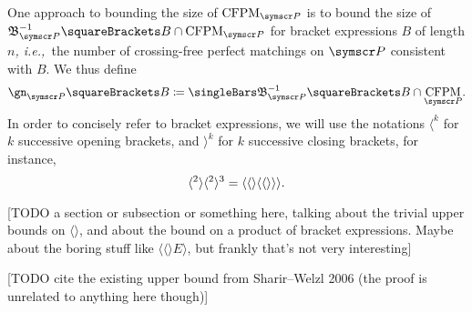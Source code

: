 \documentclass[10pt, a4paper, twoside]{basestyle}
\newcommand{\idest}{\emph{, i.e.,\ }}
\DeclareMathOperator{\CFPM}{CFPM}
\newcommand{\pointset}{\symscr}
\begin{document}
One approach to bounding the size of $\CFPM_{\pointset P}$ is to bound the size of
${\mathfrak B}_{\pointset P}^{-1}\of{B}\Intersection \CFPM_{\pointset P}$ for bracket expressions $B$ of length $n$\idest the
number of crossing-free perfect matchings on $\pointset P$ consistent with $B$. We thus define
\[\gn_{\pointset P}\of B \DefineAs
\Cardinality{{\mathfrak B}_{\pointset P}^{-1}\of{B}\Intersection \CFPM_{\pointset P}}\text.\]
In order to concisely refer to bracket expressions, we will use the notations
$\langle^k$ for $k$ successive opening brackets, and $\rangle^k$ for $k$ successive
closing brackets, for instance,\[
\langle^2\rangle\langle^2\rangle^3 = \langle\langle\rangle\langle\langle\rangle\rangle\rangle
\text.\]

[TODO a section or subsection or something here, talking about the trivial upper bounds on $\langle\rangle$,
and about the bound on a product of bracket expressions. Maybe about the boring stuff like
$\langle\langle\rangle E \rangle$, but frankly that's not very interesting]

[TODO cite the existing upper bound from Sharir--Welzl 2006 (the proof is unrelated to anything here
though)]
\label{boundOnLeftRightPerfectMatchings}
\end{document}
